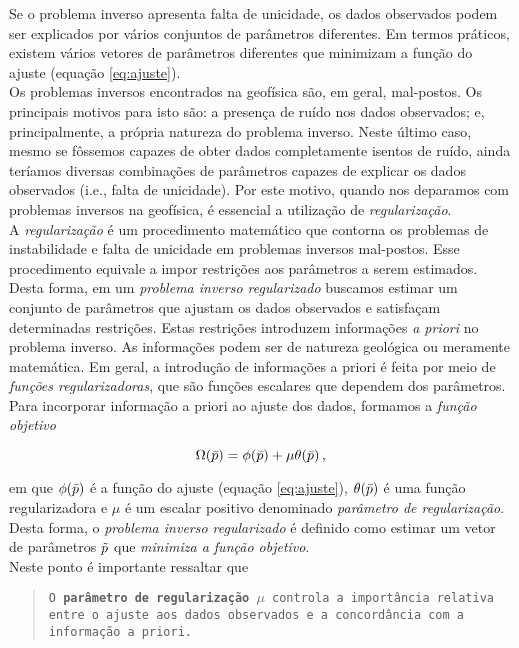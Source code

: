 \noindent Se o problema inverso apresenta falta de unicidade,
os dados observados podem ser explicados por vários
conjuntos de parâmetros diferentes. Em termos práticos, existem vários vetores
de parâmetros diferentes que minimizam a função do ajuste
(equação \ref{eq:ajuste}).
\\
\indent Os problemas inversos encontrados na geofísica são, em geral, mal-postos.
Os principais motivos para isto são: a presença de ruído nos dados observados; e,
principalmente, a própria natureza do problema inverso.
Neste último caso, mesmo se fôssemos capazes de obter dados completamente isentos de ruído, ainda
teríamos diversas combinações de parâmetros capazes de explicar os dados
observados (i.e., falta de unicidade).
Por este motivo, quando nos deparamos com problemas inversos na geofísica,
é essencial a utilização de {\it regularização}.
\\
\indent A {\it regularização} é um procedimento matemático que contorna os
problemas de ins\-tabilidade e falta de unicidade em problemas inversos mal-postos.
Esse procedimento equivale a impor restrições aos parâmetros a serem estimados.
Desta forma, em um {\it problema inverso regularizado} buscamos estimar um
conjunto de parâmetros que ajustam os dados observados e satisfaçam
determinadas restrições.
Estas restrições introduzem informações {\it a priori} no problema inverso.
As informações podem ser de natureza geológica ou meramente matemática.
Em geral, a introdução de informações a priori é feita por meio de {\it funções
regularizadoras}, que são funções escalares que dependem dos parâmetros.
Para incorporar informação a priori ao ajuste dos dados, formamos a
{\it função objetivo}

\begin{equation}
\Omega(\bar{p}) = \phi(\bar{p}) + \mu\theta(\bar{p}) \thinspace ,
\label{eq:objetivo}
\end{equation}

\noindent em que $\phi(\bar{p})$ é a função do ajuste (equação \ref{eq:ajuste}),
$\theta(\bar{p})$ é uma função regularizadora e $\mu$ é um escalar positivo
denominado {\it parâmetro de regularização}.
Desta forma, o {\it problema inverso regularizado} é definido como estimar um
vetor de parâmetros $\tilde{p}$ que {\it minimiza a função objetivo}.
\\
\indent Neste ponto é importante ressaltar que

\begin{quote}
{\tt O {\bf parâmetro de regularização} $\mu$ controla a importância relativa
en\-tre o ajuste aos dados observados e a concordância com a infor\-ma\-ção
a priori.}
\end{quote}

